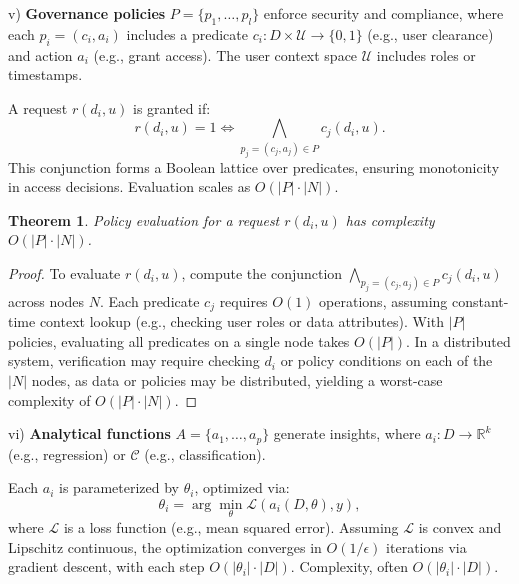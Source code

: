 \documentclass{amsart}
\newtheorem{thm}{Theorem}
\newcommand\R{\mathbb R}
\begin{document}
v) \textbf{Governance policies}  
\label{subsec:policies}
\( P = \{p_1, \dots, p_l\} \) enforce security and compliance, where each \( p_i = (c_i, a_i) \) includes a predicate \( c_i: D \times \mathcal{U} \to \{0, 1\} \) (e.g., user clearance) and action \( a_i \) (e.g., grant access). The user context space \( \mathcal{U} \) includes roles or timestamps.

A request \( r(d_i, u) \) is granted if:
\[
r(d_i, u) = 1 \iff \bigwedge_{p_j = (c_j, a_j) \in P} c_j(d_i, u).
\]
%
This conjunction forms a Boolean lattice over predicates, ensuring monotonicity in access decisions.
%
Evaluation scales as \( O(|P| \cdot |N|) \).

\begin{thm} \label{thm:policy_evaluation_complexity}
Policy evaluation for a request \( r(d_i, u) \) has complexity \( O(|P| \cdot |N|) \).
\end{thm}

\begin{proof}
To evaluate \( r(d_i, u) \), compute the conjunction \( \bigwedge_{p_j = (c_j, a_j) \in P} c_j(d_i, u) \) across nodes \( N \). Each predicate \( c_j \) requires \( O(1) \) operations, assuming constant-time context lookup (e.g., checking user roles or data attributes). With \( |P| \) policies, evaluating all predicates on a single node takes \( O(|P|) \). In a distributed system, verification may require checking \( d_i \) or policy conditions on each of the \( |N| \) nodes, as data or policies may be distributed, yielding a worst-case complexity of \( O(|P| \cdot |N|) \).
\end{proof}


vi)  \textbf{Analytical functions}
\label{subsec:analytics}
 \( A = \{a_1, \dots, a_p\} \) generate insights, where \( a_i: D \to \R^k \) (e.g., regression) or \( \mathcal{C} \) (e.g., classification).

Each \( a_i \) is parameterized by \( \theta_i \), optimized via:
\[
\theta_i = \arg\min_{\theta} \mathcal{L}(a_i(D, \theta), y),
\]
where \( \mathcal{L} \) is a loss function (e.g., mean squared error). Assuming \( \mathcal{L} \) is convex and Lipschitz continuous, the optimization converges in \( O(1/\epsilon) \) iterations via gradient descent, with each step \( O(|\theta_i| \cdot |D|) \). Complexity, often \( O(|\theta_i| \cdot |D|) \).
\end{document}
